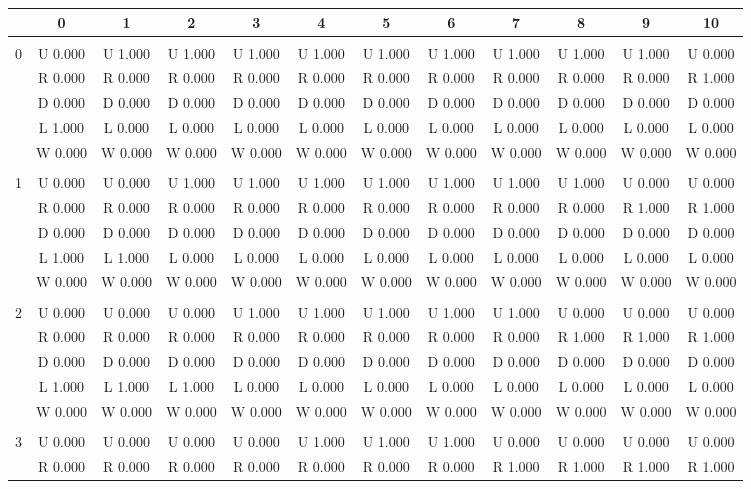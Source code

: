  \begin{table}[htbp]
\centering
\begin{tiny}
\begin{tabular}{c|c|c|c|c|c|c|c|c|c|c|c|}
&0&1&2&3&4&5&6&7&8&9&10\\ \hline\\
0&U 0.000&U 1.000&U 1.000&U 1.000&U 1.000&U 1.000&U 1.000&U 1.000&U 1.000&U 1.000&U 0.000\\
&R 0.000&R 0.000&R 0.000&R 0.000&R 0.000&R 0.000&R 0.000&R 0.000&R 0.000&R 0.000&R 1.000\\
&D 0.000&D 0.000&D 0.000&D 0.000&D 0.000&D 0.000&D 0.000&D 0.000&D 0.000&D 0.000&D 0.000\\
&L 1.000&L 0.000&L 0.000&L 0.000&L 0.000&L 0.000&L 0.000&L 0.000&L 0.000&L 0.000&L 0.000\\
&W 0.000&W 0.000&W 0.000&W 0.000&W 0.000&W 0.000&W 0.000&W 0.000&W 0.000&W 0.000&W 0.000\\
\hline \\
1&U 0.000&U 0.000&U 1.000&U 1.000&U 1.000&U 1.000&U 1.000&U 1.000&U 1.000&U 0.000&U 0.000\\
&R 0.000&R 0.000&R 0.000&R 0.000&R 0.000&R 0.000&R 0.000&R 0.000&R 0.000&R 1.000&R 1.000\\
&D 0.000&D 0.000&D 0.000&D 0.000&D 0.000&D 0.000&D 0.000&D 0.000&D 0.000&D 0.000&D 0.000\\
&L 1.000&L 1.000&L 0.000&L 0.000&L 0.000&L 0.000&L 0.000&L 0.000&L 0.000&L 0.000&L 0.000\\
&W 0.000&W 0.000&W 0.000&W 0.000&W 0.000&W 0.000&W 0.000&W 0.000&W 0.000&W 0.000&W 0.000\\
\hline \\
2&U 0.000&U 0.000&U 0.000&U 1.000&U 1.000&U 1.000&U 1.000&U 1.000&U 0.000&U 0.000&U 0.000\\
&R 0.000&R 0.000&R 0.000&R 0.000&R 0.000&R 0.000&R 0.000&R 0.000&R 1.000&R 1.000&R 1.000\\
&D 0.000&D 0.000&D 0.000&D 0.000&D 0.000&D 0.000&D 0.000&D 0.000&D 0.000&D 0.000&D 0.000\\
&L 1.000&L 1.000&L 1.000&L 0.000&L 0.000&L 0.000&L 0.000&L 0.000&L 0.000&L 0.000&L 0.000\\
&W 0.000&W 0.000&W 0.000&W 0.000&W 0.000&W 0.000&W 0.000&W 0.000&W 0.000&W 0.000&W 0.000\\
\hline \\
3&U 0.000&U 0.000&U 0.000&U 0.000&U 1.000&U 1.000&U 1.000&U 0.000&U 0.000&U 0.000&U 0.000\\
&R 0.000&R 0.000&R 0.000&R 0.000&R 0.000&R 0.000&R 0.000&R 1.000&R 1.000&R 1.000&R 1.000\\

\end{tabular}
\end{tiny}
\end{table}
